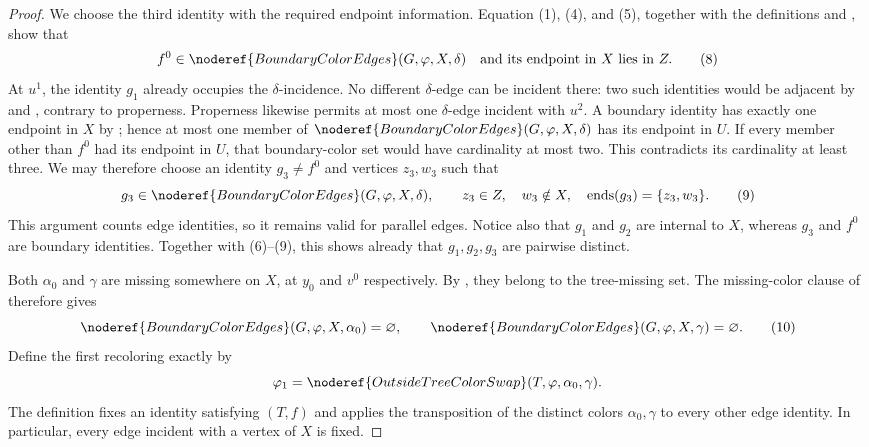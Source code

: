 \begin{proof}
We choose the third identity with the required endpoint information.
Equation (1), (4), and (5), together with the definitions
 and , show that
\[
 f^0\in\noderef{BoundaryColorEdges}(G,\varphi,X,\delta)
 \quad\hbox{and its endpoint in }X\hbox{ lies in }Z.           \tag{8}
\]
At $u^1$, the identity $g_1$ already occupies the $\delta$-incidence.
No different $\delta$-edge can be incident there: two such identities
would be adjacent by  and ,
contrary to properness.  Properness likewise permits at most one
$\delta$-edge incident with $u^2$.  A boundary identity has exactly one
endpoint in $X$ by ; hence at most one member of
$\noderef{BoundaryColorEdges}(G,\varphi,X,\delta)$ has its endpoint in
$U$.  If every member other than $f^0$ had its endpoint in $U$, that
boundary-color set would have cardinality at most two.  This contradicts
its cardinality at least three.  We may therefore choose an identity
$g_3\ne f^0$ and vertices $z_3,w_3$ such that
\[
 g_3\in\noderef{BoundaryColorEdges}(G,\varphi,X,\delta),\qquad
 z_3\in Z,\quad w_3\notin X,\quad
 \operatorname{ends}(g_3)=\{z_3,w_3\}.                         \tag{9}
\]
This argument counts edge identities, so it remains valid for parallel
edges.  Notice also that $g_1$ and $g_2$ are internal to $X$, whereas
$g_3$ and $f^0$ are boundary identities.  Together with (6)--(9), this
shows already that $g_1,g_2,g_3$ are pairwise distinct.

Both $\alpha_0$ and $\gamma$ are missing somewhere on $X$, at $y_0$ and
$v^0$ respectively.  By , they belong to the
tree-missing set.  The missing-color clause of
 therefore gives
\[
 \noderef{BoundaryColorEdges}(G,\varphi,X,\alpha_0)=\varnothing,
 \qquad
 \noderef{BoundaryColorEdges}(G,\varphi,X,\gamma)=\varnothing. \tag{10}
\]
Define the first recoloring exactly by
\[
 \varphi_1=\noderef{OutsideTreeColorSwap}
   (T,\varphi,\alpha_0,\gamma).
\]
The definition fixes an identity satisfying
$(T,f)$ and applies the transposition of the
distinct colors $\alpha_0,\gamma$ to every other edge identity.  In
particular, every edge incident with a vertex of $X$ is fixed.


\end{proof}
